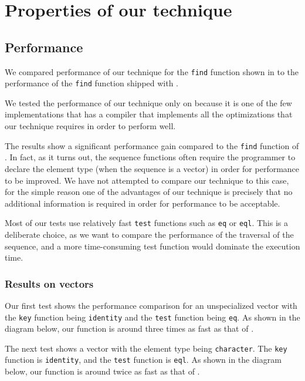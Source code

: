 \section{Properties of our technique}

\subsection{Performance}

We compared performance of our technique for the \texttt{find}
function shown in  to the
performance of the \texttt{find} function shipped with \sbcl{}.

We tested the performance of our technique only on \sbcl{} because it
is one of the few implementations that has a compiler that implements
all the optimizations that our technique requires in order to perform
well.

The results show a significant performance gain compared to the
\texttt{find} function of \sbcl{}.  In fact, as it turns out, the
\sbcl{} sequence functions often require the programmer to declare the
element type (when the sequence is a vector) in order for performance
to be improved.  We have not attempted to compare our technique to
this case, for the simple reason one of the advantages of our
technique is precisely that no additional information is required in
order for performance to be acceptable.

Most of our tests use relatively fast \texttt{test} functions such as
\texttt{eq} or \texttt{eql}.  This is a deliberate choice, as we
want to compare the performance of the traversal of the sequence,
and a more time-consuming test function would dominate the execution
time.

\subsubsection{Results on vectors}

Our first test shows the performance comparison for an unspecialized
vector with the \texttt{key} function being \texttt{identity} and the
\texttt{test} function being \texttt{eq}.  As shown in the diagram
below, our function is around three times as fast as that of \sbcl{}.


The next test shows a vector with the element type being
\texttt{character}.  The \texttt{key} function is \texttt{identity},
and the \texttt{test} function is \texttt{eql}.  As shown in the
diagram below, our function is around twice as fast as that of
\sbcl{}.

